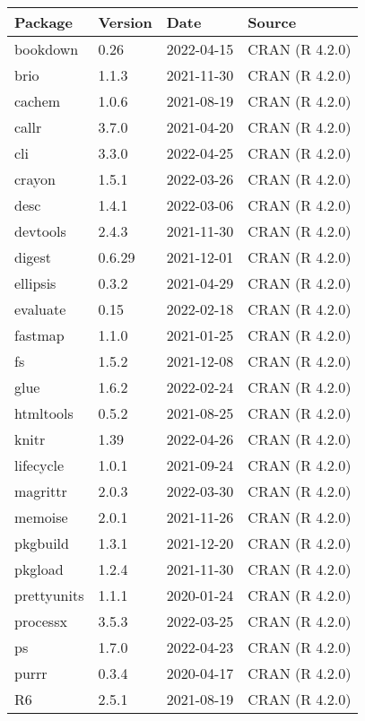 \documentclass[
]{book}
\theoremstyle{definition}
\theoremstyle{definition}
\theoremstyle{definition}
\theoremstyle{definition}
\theoremstyle{remark}
\begin{document}
\begin{tabular}{l|l|l|l}
\hline
Package & Version & Date & Source\\
\hline
bookdown & 0.26 & 2022-04-15 & CRAN (R 4.2.0)\\
\hline
brio & 1.1.3 & 2021-11-30 & CRAN (R 4.2.0)\\
\hline
cachem & 1.0.6 & 2021-08-19 & CRAN (R 4.2.0)\\
\hline
callr & 3.7.0 & 2021-04-20 & CRAN (R 4.2.0)\\
\hline
cli & 3.3.0 & 2022-04-25 & CRAN (R 4.2.0)\\
\hline
crayon & 1.5.1 & 2022-03-26 & CRAN (R 4.2.0)\\
\hline
desc & 1.4.1 & 2022-03-06 & CRAN (R 4.2.0)\\
\hline
devtools & 2.4.3 & 2021-11-30 & CRAN (R 4.2.0)\\
\hline
digest & 0.6.29 & 2021-12-01 & CRAN (R 4.2.0)\\
\hline
ellipsis & 0.3.2 & 2021-04-29 & CRAN (R 4.2.0)\\
\hline
evaluate & 0.15 & 2022-02-18 & CRAN (R 4.2.0)\\
\hline
fastmap & 1.1.0 & 2021-01-25 & CRAN (R 4.2.0)\\
\hline
fs & 1.5.2 & 2021-12-08 & CRAN (R 4.2.0)\\
\hline
glue & 1.6.2 & 2022-02-24 & CRAN (R 4.2.0)\\
\hline
htmltools & 0.5.2 & 2021-08-25 & CRAN (R 4.2.0)\\
\hline
knitr & 1.39 & 2022-04-26 & CRAN (R 4.2.0)\\
\hline
lifecycle & 1.0.1 & 2021-09-24 & CRAN (R 4.2.0)\\
\hline
magrittr & 2.0.3 & 2022-03-30 & CRAN (R 4.2.0)\\
\hline
memoise & 2.0.1 & 2021-11-26 & CRAN (R 4.2.0)\\
\hline
pkgbuild & 1.3.1 & 2021-12-20 & CRAN (R 4.2.0)\\
\hline
pkgload & 1.2.4 & 2021-11-30 & CRAN (R 4.2.0)\\
\hline
prettyunits & 1.1.1 & 2020-01-24 & CRAN (R 4.2.0)\\
\hline
processx & 3.5.3 & 2022-03-25 & CRAN (R 4.2.0)\\
\hline
ps & 1.7.0 & 2022-04-23 & CRAN (R 4.2.0)\\
\hline
purrr & 0.3.4 & 2020-04-17 & CRAN (R 4.2.0)\\
\hline
R6 & 2.5.1 & 2021-08-19 & CRAN (R 4.2.0)\\
\hline

\end{tabular}
\end{document}
